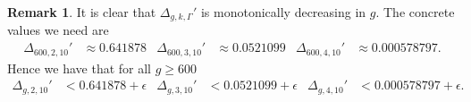 \documentclass[12pt]{amsart}
\theoremstyle{definition}
\newtheorem{rem}[thm]{Remark}
\numberwithin{equation}{section}
\newcommand{\numcheck}[1]{\cite[Computation #1]{SupplementaryNotebook}}
\theoremstyle{definition} %
\theoremstyle{remark}
\begin{document}
\begin{rem}\label{rem:Deltapp mono}
    It is clear that $\Delta_{g,k,\Gamma}'$ is monotonically decreasing in $g$.  The concrete values we need are \numcheck{DELTAEVAL}
\begin{align*}
    \Delta_{600,2,10}' &\approx 0.641878 &
    \Delta_{600,3,10}' &\approx 0.0521099 &
    \Delta_{600,4,10}' &\approx 0.000578797 
    .
\end{align*}
Hence we have that for all $g\geq 600$
\begin{align*}
    \Delta_{g,2,10}' &< 0.641878 +\epsilon&
    \Delta_{g,3,10}' &< 0.0521099 +\epsilon&
    \Delta_{g,4,10}' &< 0.000578797 +\epsilon
    .
\end{align*}

\end{rem}
\end{document}
